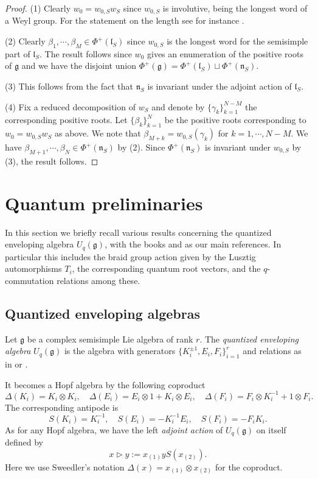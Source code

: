 \documentclass[a4paper, 12pt, reqno, english]{amsart}
\numberwithin{equation}{section}
\numberwithin{figure}{section}
\theoremstyle{plain}
\theoremstyle{plain}
\theoremstyle{plain}
\theoremstyle{plain}
\theoremstyle{plain}
\theoremstyle{definition}
\theoremstyle{definition}
\theoremstyle{definition}
\theoremstyle{remark}
\theoremstyle{definition}
\theoremstyle{definition}
\newcommand{\Uqg}{U_q(\mathfrak{g})}
\newcommand{\lieg}{\mathfrak{g}}
\newcommand{\liel}{\mathfrak{l}}
\newcommand{\lien}{\mathfrak{n}}
\newcommand{\roots}{\Phi}
\begin{document}
\begin{proof}
(1) Clearly $w_0 = w_{0, S} w_S$ since $w_{0, S}$ is involutive, being the longest word of a Weyl group.
For the statement on the length see for instance \cite[Section 1.8]{humphreys}.

(2) Clearly $\beta_1, \cdots, \beta_M \in \roots^+(\liel_S)$ since $w_{0, S}$ is the longest word for the semisimple part of $\liel_S$.
The result follows since $w_0$ gives an enumeration of the positive roots of $\lieg$ and we have the disjoint union $\roots^+(\lieg) = \roots^+(\liel_S) \sqcup \roots^+(\lien_S)$.

(3) This follows from the fact that $\lien_S$ is invariant under the adjoint action of $\liel_S$.

(4) Fix a reduced decomposition of $w_S$ and denote by $\{ \gamma_k \}_{k = 1}^{N - M}$ the corresponding positive roots.
Let $\{ \beta_k \}_{k = 1}^N$ be the positive roots corresponding to $w_0 = w_{0, S} w_S$ as above.
We note that $\beta_{M + k} = w_{0, S} (\gamma_k)$ for $k = 1, \cdots, N - M$.
We have $\beta_{M + 1}, \cdots, \beta_N \in \roots^+(\lien_S)$ by (2).
Since $\roots^+(\lien_S)$ is invariant under $w_{0, S}$ by (3), the result follows.
\end{proof}

\section{Quantum preliminaries}
\label{sec:quantum-preliminaries}

In this section we briefly recall various results concerning the quantized enveloping algebra $\Uqg$, with the books  \cite{jantzen} and \cite{brown-goodearl} as our main references.
In particular this includes the braid group action given by the Lusztig automorphisms $T_i$, the corresponding quantum root vectors, and the $q$-commutation relations among these.

\subsection{Quantized enveloping algebras}

Let $\lieg$ be a complex semisimple Lie algebra of rank $r$.
The \emph{quantized enveloping algebra} $\Uqg$ is the algebra with generators $\{ K_i^{\pm 1}, E_i, F_i \}_{i = 1}^r$ and relations as in \cite[Section 4.3]{jantzen} or \cite[Section I.6.3]{brown-goodearl}.

It becomes a Hopf algebra by the following coproduct
\[
\Delta(K_i) = K_i \otimes K_i, \quad
\Delta(E_i) = E_i \otimes 1 + K_i \otimes E_i, \quad
\Delta(F_i) = F_i \otimes K_i^{-1} + 1 \otimes F_i.
\]
The corresponding antipode is
\[
S(K_i) = K_i^{-1}, \quad
S(E_i) = - K_i^{-1} E_i, \quad
S(F_i) = - F_i K_i.
\]
As for any Hopf algebra, we have the left \emph{adjoint action} of $\Uqg$ on itself defined by
\[
x \triangleright y := x_{(1)} y S(x_{(2)}).
\]
Here we use Sweedler's notation $\Delta(x) = x_{(1)} \otimes x_{(2)}$ for the coproduct.
\end{document}

